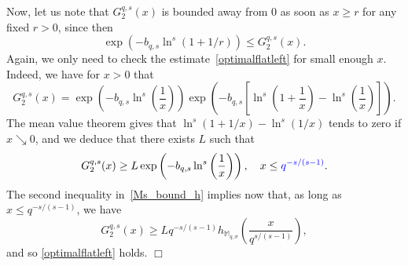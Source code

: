 \documentclass[11pt,a4paper]{article}
\theoremstyle{plain}
\theoremstyle{definition}
\newenvironment{proof1}{\medskip\par\noindent{\bf Proof.}}{\hfill $\Box$
\medskip\par}
\def\Ms{{\mathbb{M}}_{q,\sigma}}
\begin{document}
\begin{proof1}
Now, let us note that $G_2^{q,s}(x)$ is bounded away from 0 as soon as $x\ge r$ for any fixed $r>0$, since then
	$$
	\exp\left(-b_{q,s}\ln^s\left(1+1/r\right)\right)\leq G_2^{q,s}(x).
	$$
Again, we only need to check the estimate~\eqref{optimalflatleft} for small enough $x$. Indeed, we have for $x>0$ that
\begin{equation*}
		G_2^{q,s}(x)= \exp\left(-b_{q,s}\ln^s\left(\frac{1}{x}\right)\right) \exp\left(-b_{q,s}\left[\ln^s\left(1+\frac{1}{x}\right)- \ln^s\left(\frac{1}{x}\right)\right]\right).
\end{equation*}
The mean value theorem gives that $\ln^s(1+1/x)-\ln^s(1/x)$ tends to zero if $x\searrow 0$, and we deduce that there exists $L$ such that
\begin{equation*}
		G_2^{q,s}(x)\geq  L\exp\left(-b_{q,s}\ln^s\left(\frac{1}{x}\right)\right),
		\quad x\leq {\color{blue}q^{-s/(s-1)}}.
\end{equation*}
The second inequality in~\eqref{Ms_bound_h} implies now that, as long as $x\le q^{-s/(s-1)}$, we have
\begin{equation*}
		G_2^{q,s}(x)\geq  Lq^{-s/(s-1)} h_{\Ms}\left(\frac{x}{q^{s/(s-1)}}\right),
\end{equation*}
and so \eqref{optimalflatleft} holds.
%
%
\end{proof1}
\end{document}
